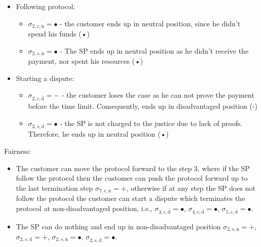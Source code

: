 \documentclass{ieeeaccess}
\begin{document}
\begin{itemize}
\item
  Following protocol:

  \begin{itemize}
  
  \item
    \(\sigma_{2, c, \overline{\mathrm{n}}} = •\) - the customer ends up
    in neutral position, since he didn't spend his funds (•)
  \item
    \(\sigma_{2, s, \overline{\mathrm{n}}} = •\) - The SP ends up in
    neutral position as he didn't receive the payment, nor spent his
    resources (•)
  \end{itemize}
\item
  Starting a dispute:

  \begin{itemize}
  
  \item
    \(\sigma_{2, c, \overline{\mathrm{d}}} = -\) - the customer loses
    the case as he can not prove the payment before the time limit.
    Consequently, ends up in disadvantaged position (-)
  \item
    \(\sigma_{2, s, \overline{\mathrm{d}}} = •\) - the SP is not charged
    to the justice due to lack of proofs. Therefore, he ends up in
    neutral position (•)
  \end{itemize}
\end{itemize}

Fairness:

\begin{itemize}

\item
  The customer can move the protocol forward to the step 3, where if the
  SP follow the protocol then the customer can push the protocol forward
  up to the last termination step \(\sigma_{7, c, \mathrm{n}} = +\),
  otherwise if at any step the SP does not follow the protocol the
  customer can start a dispute which terminates the protocol at
  non-disadvantaged position, i.e.,
  \(\sigma_{3, c, \overline{\mathrm{d}}} = •\),
  \(\sigma_{4, c, \overline{\mathrm{d}}} = •\),
  \(\sigma_{5, c, \overline{\mathrm{d}}} = •\).
\item
  The SP can do nothing and end up in non-disadvantaged position
  \(\sigma_{2, s, \mathrm{n}} = +\), \(\sigma_{2, s, \mathrm{d}} = +\),
  \(\sigma_{2, s, \overline{\mathrm{n}}} = •\),
  \(\sigma_{2, s, \overline{\mathrm{d}}} = •\).
\end{itemize}
\end{document}
